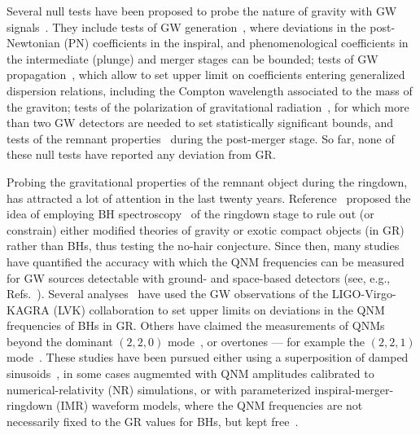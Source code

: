 \documentclass[twocolumn,
               prd,
               aps,
               superscriptaddress,
               tightenlines,
               nofootinbib,
               eqsecnum,
               amsfonts,
               amsmath,
               longbibliography]{revtex4-1}
\begin{document}
Several null tests have been proposed to probe the nature of gravity with GW signals~\cite{TheLIGOScientific:2016src,Yunes:2016jcc,Abbott:2018lct,LIGOScientific:2019fpa,Abbott:2020jks,LIGOScientific:2021sio}. They include tests of GW generation~\cite{Arun:2006yw,Yunes:2009ke,Li:2011cg,Agathos:2013upa,Mehta:2022pcn}, where deviations in the post-Newtonian (PN) coefficients in the inspiral, and phenomenological coefficients in the intermediate (plunge) and merger stages can be bounded; tests of GW propagation~\cite{Will:1997bb}, which allow to set upper limit on coefficients entering generalized dispersion relations, including the Compton wavelength associated to the
mass of the graviton; tests of the polarization of gravitational radiation~\cite{Will:2014kxa}, for which more than
two GW detectors are needed to set statistically significant bounds, and tests of the remnant properties~\cite{Meidam:2014jpa,Carullo:2018sfu,Brito:2018rfr,Carullo:2019flw,Isi:2019aib,Ghosh:2021mrv,Carullo:2021dui}
during the post-merger stage. So far, none of these null tests have reported any deviation from GR.

Probing the gravitational properties of the remnant object during the
ringdown, has attracted a lot of attention in the last twenty years.
Reference~\cite{Dreyer:2003bv} proposed the idea of employing BH spectroscopy~\cite{Detweiler:1980gk}
of the ringdown stage to rule out (or constrain) either modified theories of
gravity or exotic compact objects (in GR) rather than BHs, thus
testing the no-hair conjecture. Since then, many studies have quantified the accuracy
with which the QNM frequencies can be measured for
GW sources detectable with ground- and space-based detectors (see, e.g., Refs.~\cite{Berti:2005ys,Baibhav:2020tma,Bhagwat:2021kwv,Ota:2021ypb}). Several analyses~\cite{Carullo:2018sfu,
Brito:2018rfr,Carullo:2019flw,Isi:2019aib,Ghosh:2021mrv,Carullo:2021dui}
have used the GW observations of the LIGO-Virgo-KAGRA (LVK) collaboration to set upper
limits on deviations in the QNM frequencies of BHs in GR. Others have claimed
the measurements of QNMs beyond the dominant $(2,2,0)$ mode~\cite{Capano:2021etf},
or overtones --- for example the $(2,2,1)$ mode~\cite{Isi:2019aib,Cotesta:2022pci,Isi:2022mhy}.
%
These studies have been pursued either using a superposition
of damped sinusoids~\cite{Giesler:2019uxc,Carullo:2019flw}, in some cases augmemted with QNM amplitudes calibrated to
numerical-relativity (NR) simulations, or with parameterized inspiral-merger-ringdown (IMR)
waveform models, where the QNM frequencies are not necessarily fixed
to the GR values for BHs, but kept free~\cite{Brito:2018rfr,Ghosh:2021mrv}.
\end{document}
